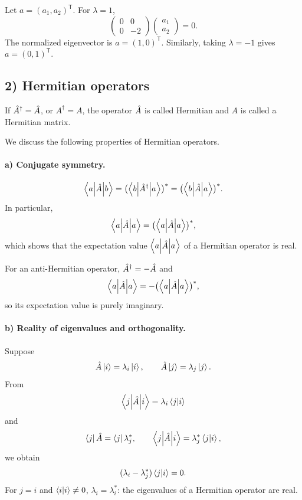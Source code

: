 Let $a=(a_1,a_2)^{\mathsf T}$. For $\lambda=1$,
\begin{equation}
\begin{pmatrix}0&0\\0&-2\end{pmatrix}
\begin{pmatrix}a_1\\a_2\end{pmatrix}=0.
\end{equation}
The normalized eigenvector is $a=(1,0)^{\mathsf T}$. Similarly, taking $\lambda=-1$ gives $a=(0,1)^{\mathsf T}$.
\subsection*{2) Hermitian operators}
If $\hat{A}^\dagger=\hat{A}$, or $A^\dagger=A$, the operator $\hat{A}$ is called Hermitian and $A$ is called a Hermitian matrix.

We discuss the following properties of Hermitian operators.
\paragraph{a) Conjugate symmetry.}
\begin{equation}
\left\langle a\middle|\hat{A}\middle|b\right\rangle=\bigl(\left\langle b\middle|\hat{A}^\dagger\middle|a\right\rangle\bigr)^*=\bigl(\left\langle b\middle|\hat{A}\middle|a\right\rangle\bigr)^*.
\end{equation}
In particular,
\begin{equation}
\left\langle a\middle|\hat{A}\middle|a\right\rangle=\bigl(\left\langle a\middle|\hat{A}\middle|a\right\rangle\bigr)^*,
\end{equation}
which shows that the expectation value $\left\langle a\middle|\hat{A}\middle|a\right\rangle$ of a Hermitian operator is real.

For an anti-Hermitian operator, $\hat{A}^\dagger=-\hat{A}$ and
\begin{equation}
\left\langle a\middle|\hat{A}\middle|a\right\rangle=-\bigl(\left\langle a\middle|\hat{A}\middle|a\right\rangle\bigr)^*,
\end{equation}
so its expectation value is purely imaginary.
\paragraph{b) Reality of eigenvalues and orthogonality.}
Suppose
\begin{equation}
\hat{A}\left|i\right\rangle=\lambda_i\left|i\right\rangle,\qquad \hat{A}\left|j\right\rangle=\lambda_j\left|j\right\rangle.
\end{equation}
From
\begin{equation}
\left\langle j\middle|\hat{A}\middle|i\right\rangle=\lambda_i\left\langle j\middle|i\right\rangle
\end{equation}
and
\begin{equation}
\left\langle j\right|\hat{A}=\left\langle j\right|\lambda_j^*,\qquad
\left\langle j\middle|\hat{A}\middle|i\right\rangle=\lambda_j^*\left\langle j\middle|i\right\rangle,
\end{equation}
we obtain
\begin{equation}
(\lambda_i-\lambda_j^*)\left\langle j\middle|i\right\rangle=0.
\end{equation}
For $j=i$ and $\left\langle i\middle|i\right\rangle\ne0$, $\lambda_i=\lambda_i^*$: the eigenvalues of a Hermitian operator are real.

